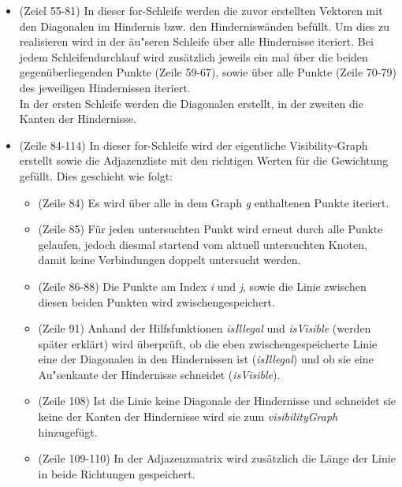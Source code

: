 \documentclass[a4paper]{scrartcl}
\begin{document}
\begin{itemize}
	\item (Zeiel 55-81) In dieser for-Schleife werden die zuvor erstellten Vektoren mit den Diagonalen im Hindernis bzw. den Hinderniswänden befüllt. Um dies zu realisieren wird in der äu"seren Schleife über alle Hindernisse iteriert. Bei jedem Schleifendurchlauf wird zusätzlich jeweils ein mal über die beiden gegenüberliegenden Punkte (Zeile 59-67), sowie über alle Punkte (Zeile 70-79) des jeweiligen Hindernissen iteriert.\\
	In der ersten Schleife werden die Diagonalen erstellt, in der zweiten die Kanten der Hindernisse.
	\item (Zeile 84-114) In dieser for-Schleife wird der eigentliche Visibility-Graph erstellt sowie die Adjazenzliste mit den richtigen Werten für die Gewichtung gefüllt. Dies geschieht wie folgt:\\
	\begin{itemize}
		\item (Zeile 84) Es wird über alle in dem Graph \textit{g} enthaltenen Punkte iteriert.
		\item (Zeile 85) Für jeden untersuchten Punkt wird erneut durch alle Punkte gelaufen, jedoch diesmal startend vom aktuell untersuchten Knoten, damit keine Verbindungen doppelt untersucht werden.
		\item (Zeile 86-88) Die Punkte am Index \textit{i} und \textit{j}, sowie die Linie zwischen diesen beiden Punkten wird zwischengespeichert.
		\item (Zeile 91) Anhand der Hilfsfunktionen \textit{isIllegal} und \textit{isVisible} (werden später erklärt) wird überprüft, ob die eben zwischengespeicherte Linie eine der Diagonalen in den Hindernissen ist (\textit{isIllegal}) und ob sie eine Au"senkante der Hindernisse schneidet (\textit{isVisible}).
		\item (Zeile 108) Ist die Linie keine Diagonale der Hindernisse und schneidet sie keine der Kanten der Hindernisse wird sie zum \textit{visibilityGraph} hinzugefügt.
		\item (Zeile 109-110) In der Adjazenzmatrix wird zusätzlich die Länge der Linie in beide Richtungen gespeichert.
		

\end{itemize}
\end{itemize}
\end{document}

